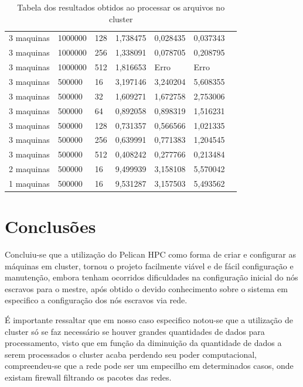 \documentclass[12pt]{article}
\begin{document}
\begin{table}[]
\begin{tabular}{l|llllll}
3 maquinas & 1000000    & 128             & 1,738475            & 0,028435          & 0,037343   &            \\
3 maquinas & 1000000    & 256             & 1,338091            & 0,078705          & 0,208795   &            \\
3 maquinas & 1000000    & 512             & 1,816653            & Erro              & Erro       &            \\
3 maquinas & 500000     & 16              & 3,197146            & 3,240204          & 5,608355   &            \\
3 maquinas & 500000     & 32              & 1,609271            & 1,672758          & 2,753006   &            \\
3 maquinas & 500000     & 64              & 0,892058            & 0,898319          & 1,516231   &            \\
3 maquinas & 500000     & 128             & 0,731357            & 0,566566          & 1,021335   &            \\
3 maquinas & 500000     & 256             & 0,639991            & 0,771383          & 1,204545   &            \\
3 maquinas & 500000     & 512             & 0,408242            & 0,277766          & 0,213484   &            \\
2 maquinas & 500000          & 16                  & 9,499939          & 3,158108   & 5,570042   \\
1 maquinas & 500000          & 16                  & 9,531287          & 3,157503   & 5,493562  
\end{tabular}
\caption{Tabela dos resultados obtidos ao processar os arquivos no cluster}
\label{tab:table-result-cluster}
\end{table}
\section{Conclusões}

Concluiu-se que a utilização do Pelican HPC como forma de criar e configurar as máquinas em cluster, tornou o projeto facilmente viável e de fácil configuração e manutenção, embora tenham ocorridos dificuldades na configuração inicial do nós escravos para o mestre, após obtido o devido conhecimento sobre o sistema em especifico a configuração dos nós escravos via rede.

É importante ressaltar que em nosso caso especifico notou-se que a utilização de cluster só se faz necessário se houver grandes 
quantidades de dados para processamento, visto que em função da diminuição da quantidade de dados a serem processados o cluster 
acaba perdendo seu poder computacional, compreendeu-se que a rede pode ser um empecilho em determinados casos, onde existam firewall filtrando os pacotes das redes.
\end{document}

